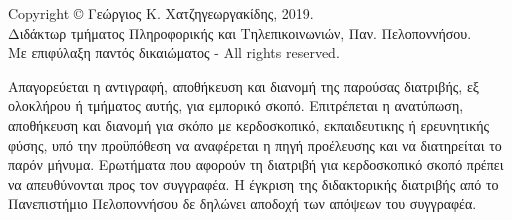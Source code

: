 

\newpage
\begin{minipage}{\textwidth}
\vspace{14cm}
\begin{center}
\justifying
Copyright \copyright{} Γεώργιος Κ. Χατζηγεωργακίδης, 2019.\\
Διδάκτωρ τμήματος Πληροφορικής και Τηλεπικοινωνιών, Παν. Πελοποννήσου.\\
Με επιφύλαξη παντός δικαιώματος - All rights reserved.
\end{center}
\begin{center}
\justifying
Απαγορεύεται η αντιγραφή, αποθήκευση και διανομή της παρούσας διατριβής, εξ ολοκλήρου ή τμήματος αυτής, για εμπορικό σκοπό. Επιτρέπεται η ανατύπωση, αποθήκευση και διανομή για σκόπο με κερδοσκοπικό, εκπαιδευτικης ή ερευνητικής φύσης, υπό την προϋπόθεση να αναφέρεται η πηγή προέλευσης και να διατηρείται το παρόν μήνυμα. Ερωτήματα που αφορούν τη διατριβή για κερδοσκοπικό σκοπό πρέπει να απευθύνονται προς τον συγγραφέα. Η έγκριση της διδακτορικής διατριβής από το Πανεπιστήμιο Πελοποννήσου δε δηλώνει αποδοχή των απόψεων του συγγραφέα.
\end{center}
\end{minipage}